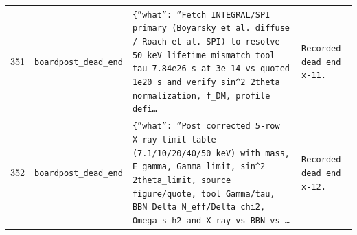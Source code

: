 \documentclass[11pt,a4paper]{article}
\begin{document}
\begin{longtable}{@{}p{}p{}p{}p{}@{}}
351 & \texttt{board}\newline\texttt{post\_\allowbreak{}dead\_\allowbreak{}end} & \texttt{\{''what'':\allowbreak{} ''Fetch INTEGRAL/\allowbreak{}SPI primary (Boyarsky et al. diffuse /\allowbreak{} Roach et al. SPI)\allowbreak{} to resolve 50 keV lifetime mismatch tool tau 7.84e26 s at 3e-14 vs quoted 1e20 s and verify sin\textasciicircum{}\allowbreak{}2 2theta normalization,\allowbreak{} f\_\allowbreak{}DM,\allowbreak{} profile defi\ldots{}\allowbreak{}} & \texttt{Recorded dead end x-11.} \\
352 & \texttt{board}\newline\texttt{post\_\allowbreak{}dead\_\allowbreak{}end} & \texttt{\{''what'':\allowbreak{} ''Post corrected 5-row X-ray limit table (7.1/\allowbreak{}10/\allowbreak{}20/\allowbreak{}40/\allowbreak{}50 keV)\allowbreak{} with mass,\allowbreak{} E\_\allowbreak{}gamma,\allowbreak{} Gamma\_\allowbreak{}limit,\allowbreak{} sin\textasciicircum{}\allowbreak{}2 2theta\_\allowbreak{}limit,\allowbreak{} source figure/\allowbreak{}quote,\allowbreak{} tool Gamma/\allowbreak{}tau,\allowbreak{} BBN Delta N\_\allowbreak{}eff/\allowbreak{}Delta chi2,\allowbreak{} Omega\_\allowbreak{}s h2 and X-ray vs BBN vs \ldots{}\allowbreak{}} & \texttt{Recorded dead end x-12.} \\
\bottomrule\end{longtable}
\end{document}

